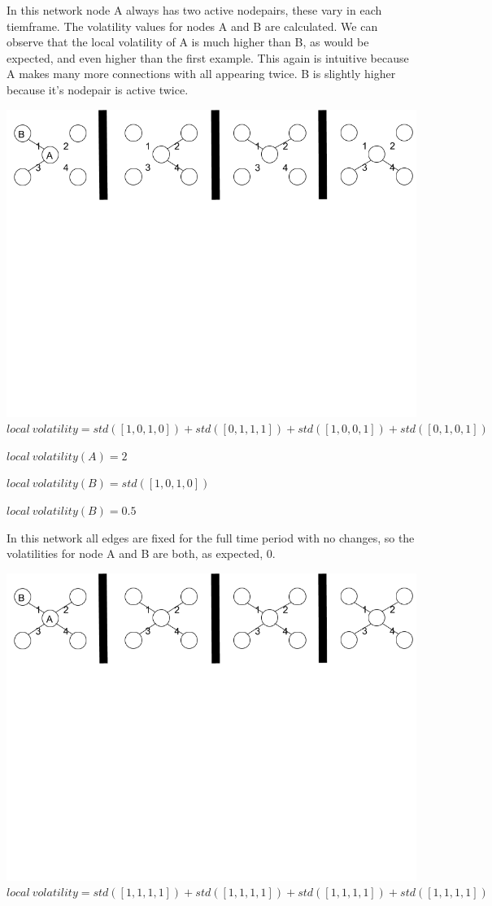 \documentclass[oneside,12pt]{Classes/RoboticsLaTeX}
\begin{document}
\begin{appendices}
In this network node A always has two active nodepairs, these vary in each tiemframe. The volatility values for nodes A and B are calculated. We can observe that the local volatility of A is much higher than B, as would be expected, and even higher than the first example. This again is intuitive because A makes many more connections with all appearing twice. B is slightly higher because it's nodepair is active twice.
\begin{center}
\includegraphics[trim={0 15cm 0 0}, width=140mm]{./Figures/volatilityAppendix3.png}
$local\ volatility = std([1,0,1,0]) + std([0,1,1,1]) + std([1,0,0,1]) + std([0,1,0,1])$

$local\ volatility(A) = 2$

$local\ volatility(B) = std([1,0,1,0])$

$local\ volatility(B) = 0.5$
\end{center}

In this network all edges are fixed for the full time period with no changes, so the volatilities for node A and B are both, as expected, 0.
\begin{center}
\includegraphics[trim={0 15cm 0 0}, width=140mm]{./Figures/volatilityAppendix4.png}
$local\ volatility = std([1,1,1,1]) + std([1,1,1,1]) + std([1,1,1,1]) + std([1,1,1,1])$


\end{center}
\end{appendices}
\end{document}

